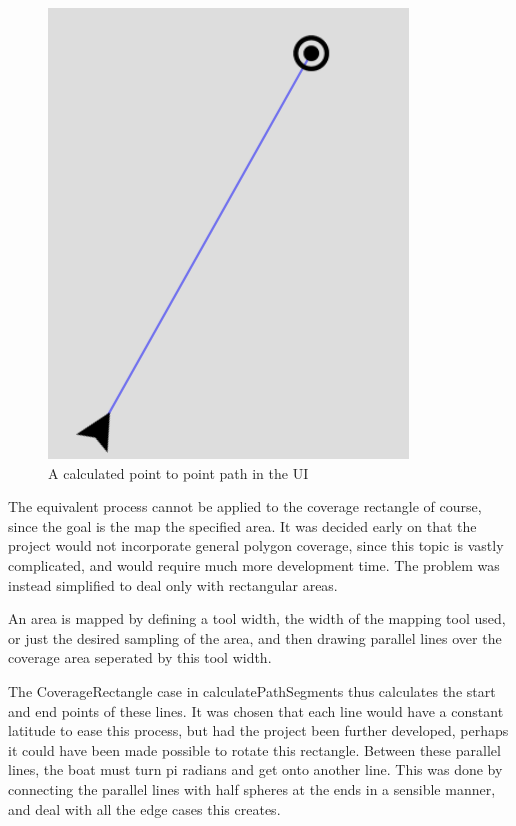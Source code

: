 \begin{figure}[H]
\centering
\includegraphics[max width=0.9\linewidth]{Images/Implementation/P2P_path_calculated}
\caption{A calculated point to point path in the UI}
\label{fig:p2p_path_traversed}
\end{figure}

The equivalent process cannot be applied to the coverage rectangle of course, since the goal is the map the specified area. It was decided early on that the project would not incorporate general polygon coverage, since this topic is vastly complicated, and would require much more development time. The problem was instead simplified to deal only with rectangular areas.

An area is mapped by defining a tool width, the width of the mapping tool used, or just the desired sampling of the area, and then drawing parallel lines over the coverage area seperated by this tool width. 

The CoverageRectangle case in calculatePathSegments thus calculates the start and end points of these lines. It was chosen that each line would have a constant latitude to ease this process, but had the project been further developed, perhaps it could have been made possible to rotate this rectangle. Between these parallel lines, the boat must turn pi radians and get onto another line. This was done by connecting the parallel lines with half spheres at the ends in a sensible manner, and deal with all the edge cases this creates. 

